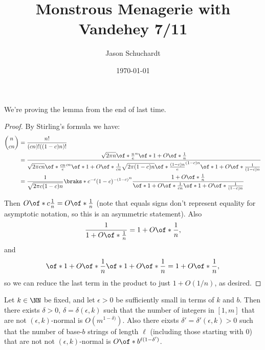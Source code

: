 \documentclass{article}
\title{Monstrous Menagerie with Vandehey 7/11}
\author{Jason Schuchardt}
\date{\today}
\begin{document}
\maketitle

We're proving the lemma from the end of last time.
\begin{proof}
    By Stirling's formula we have:
    \begin{align*}
    \binom{n}{cn} 
    &= \frac{n!}{(cn)!((1-c)n)!}
    \\
    &= \frac{\sqrt{2\pi n} \of*{\frac{n}{e}}^n \of*{1+O\of*{\frac{1}{n}}}}{
        \sqrt{2\pi cn} \of*{\frac{cn}{e}}^{cn} \of*{1+O\of*{\frac{1}{cn}}}
        \sqrt{2\pi (1-c)n} \of*{\frac{(1-c)n}{e}}^{(1-c)n} \of*{1+O\of*{\frac{1}{(1-c)n}}}
    }
    \\
    &= 
    \frac{1}{\sqrt{2\pi c(1-c)n}} 
    \braks*{c^{-c} (1-c)^{-(1-c)}}^n
    \frac{1+O\of*{\frac{1}{n}}}{
        \of*{1+O\of*{\frac{1}{cn}}}
        \of*{1+O\of*{\frac{1}{(1-c)n}}}
        }
    \end{align*}

    Then $O\of*{c\frac{1}{n}} = O\of*{\frac{1}{n}}$
    (note that equals signs don't represent equality
    for asymptotic notation, so this is an asymmetric
    statement).
    Also 
    \[\frac{1}{1+O\of*{\frac{1}{n}}} 
    = 1+O\of*{\frac{1}{n}},
    \]
    and 
    \[
    \of*{1+O\of*{\frac{1}{n}}}
    \of*{1+O\of*{\frac{1}{n}}}
    =1+O\of*{\frac{1}{n}},
    \]
    so we can reduce the last term in the product 
    to just $1+O(1/n)$, as desired.
\end{proof}

\begin{proposition}
    Let $k\in \NN$ be fixed, and let $\epsilon > 0$
    be sufficiently small in terms of $k$ and $b$.
    Then there exists $\delta > 0$, 
    $\delta=\delta(\epsilon,k)$ such that the number 
    of integers in $[1,m]$ that are not 
    $(\epsilon,k)$-normal is $O(m^{1-\delta)})$.
    Also there eixsts $\delta'=\delta'(\epsilon,k)>0$
    such that the number of base-$b$ strings of 
    length $\ell$ (including those starting with 
    $0$) that are not not $(\epsilon,k)$-normal is 
    $O\of*{b^{\ell(1-\delta')}}$.
\end{proposition}
\end{document}
